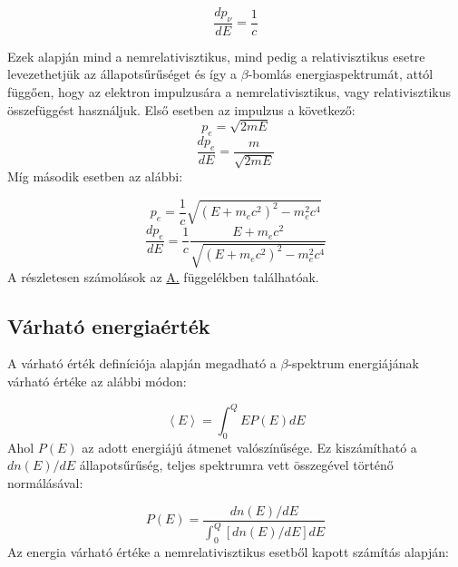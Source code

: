 \begin{multicols}{2}
\begin{enumerate}
\begin{equation} \label{eq:11}
\frac{dp_{\nu}}{dE}
=
\frac{1}{c}
\end{equation}

\end{enumerate}
Ezek alapján mind a nemrelativisztikus, mind pedig a relativisztikus esetre levezethetjük az állapotsűrűséget és így a $\beta$-bomlás energiaspektrumát, attól függően, hogy az elektron impulzusára a nemrelativisztikus, vagy relativisztikus összefüggést használjuk. Első esetben az impulzus a következő:
\begin{equation} \label{eq:12}
p_{e}
=
\sqrt{2mE}
\end{equation}
\begin{equation} \label{eq:13}
\frac{dp_{e}}{dE}
=
\frac{m}{\sqrt{2mE}}
\end{equation}
Míg második esetben az alábbi:

\begin{equation} \label{eq:14}
p_{e}
=
\frac{1}{c} \sqrt{\left( E + m_{e} c^2 \right)^2 - m_{e}^{2} c^{4}}
\end{equation}
\begin{equation} \label{eq:15}
\frac{dp_{e}}{dE}
=
\frac{1}{c} \frac{E + m_{e} c^2}{\sqrt{\left( E + m_{e} c^2 \right)^2 - m_{e}^{2} c^{4}}}
\end{equation}
A részletesen számolások az \hyperref[appendix:A]{A.} függelékben találhatóak.

\subsection{Várható energiaérték}
A várható érték definíciója alapján megadható a $\beta$-spektrum energiájának várható értéke az alábbi módon:

\begin{equation} \label{eq:16}
\left< E \right>
=
\int_{0}^{Q} E P \left( E \right) dE
\end{equation}
Ahol $P \left( E \right)$ az adott energiájú átmenet valószínűsége. Ez kiszámítható a $dn \left( E \right)/dE$ állapotsűrűség, teljes spektrumra vett összegével történő normálásával:

\begin{equation} \label{eq:17}
P \left( E \right)
=
\frac{dn \left( E \right) / dE}{\int_{0}^{Q} \left[ dn \left( E \right) / dE \right] dE}
\end{equation}
Az energia várható értéke a nemrelativisztikus esetből kapott számítás alapján:


\end{multicols}
